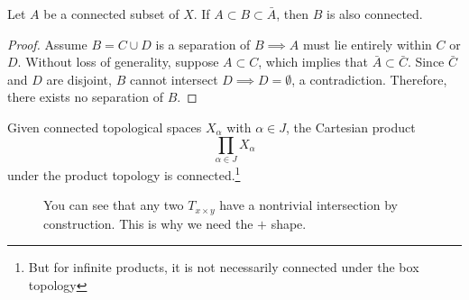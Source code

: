   \begin{theorem}
    Let $A$ be a connected subset of $X$. If $A \subset B \subset \bar{A}$, then $B$ is also connected. 
  \end{theorem}
  \begin{proof}
    Assume $B = C \cup D$ is a separation of $B \implies A$ must lie entirely within $C$ or $D$. Without loss of generality, suppose $A \subset C$, which implies that $\bar{A} \subset \bar{C}$. Since $\bar{C}$ and $D$ are disjoint, $B$ cannot intersect $D \implies D = \emptyset$, a contradiction. Therefore, there exists no separation of $B$. 
  \end{proof}

  \begin{theorem}
    Given connected topological spaces $X_\alpha$ with $\alpha \in J$, the Cartesian product 
    \begin{equation}
      \prod_{\alpha \in J} X_\alpha
    \end{equation}
    under the product topology is connected.\footnote{But for infinite products, it is not necessarily connected under the box topology} 

    \begin{figure}[H]
      \centering 
      \caption{You can see that any two $T_{x \times y}$ have a nontrivial intersection by construction. This is why we need the $+$ shape.} 
    \end{figure}
  \end{theorem}
